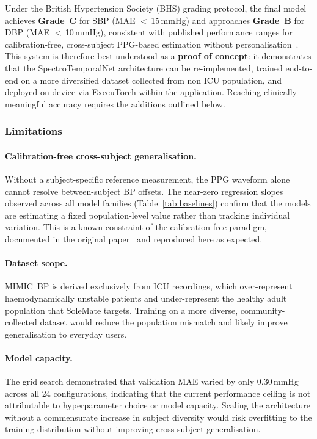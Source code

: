 \noindent Under the British Hypertension Society (BHS) grading protocol, the final model achieves
\textbf{Grade~C} for SBP (MAE $<$\,15\,mmHg) and approaches \textbf{Grade~B} for DBP
(MAE $<$\,10\,mmHg), consistent with published performance ranges for calibration-free,
cross-subject PPG-based estimation without personalisation~\cite{Slapnicar2019}.
This system is therefore best understood as a \textbf{proof of concept}: it demonstrates
that the SpectroTemporalNet architecture can be re-implemented, trained end-to-end on a
more diversified dataset collected from non ICU population, and deployed on-device via ExecuTorch within the application.
Reaching clinically meaningful accuracy requires the additions outlined below.


\subsubsection{Limitations}
\label{subsubsec:limitations}

\paragraph{Calibration-free cross-subject generalisation.}
Without a subject-specific reference measurement, the PPG waveform alone cannot resolve
between-subject BP offsets.
The near-zero regression slopes observed across all model families (Table~\ref{tab:baselines})
confirm that the models are estimating a fixed population-level value rather than tracking
individual variation.
This is a known constraint of the calibration-free paradigm, documented in the original
paper~\cite{Slapnicar2019} and reproduced here as expected.

\paragraph{Dataset scope.}
MIMIC~BP is derived exclusively from ICU recordings, which over-represent haemodynamically
unstable patients and under-represent the healthy adult population that SoleMate targets.
Training on a more diverse, community-collected dataset would reduce the population mismatch
and likely improve generalisation to everyday users.

\paragraph{Model capacity.}
The grid search demonstrated that validation MAE varied by only 0.30\,mmHg across all 24
configurations, indicating that the current performance ceiling is not attributable to
hyperparameter choice or model capacity.
Scaling the architecture without a commensurate increase in subject diversity would risk
overfitting to the training distribution without improving cross-subject generalisation.


